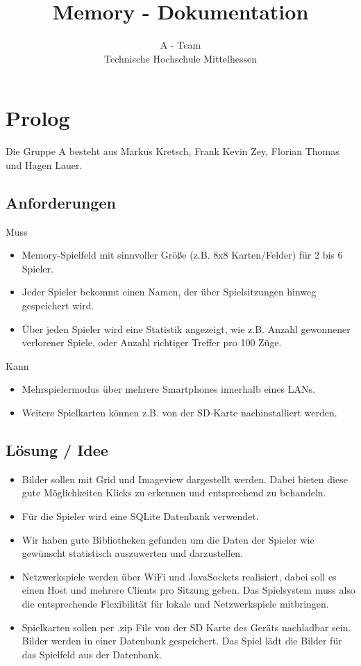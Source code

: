 \documentclass[11pt,a4paper]{article}
\begin{document}
\title{Memory - Dokumentation}
\author{A - Team\\Technische Hochschule Mittelhessen}
\renewcommand{\today}{11. September 2009}
\maketitle

\tableofcontents

\section {Prolog}
Die Gruppe A besteht aus Markus Kretsch, Frank Kevin Zey, Florian Thomas und Hagen Lauer.

\subsection{Anforderungen}

Muss
\begin{itemize}
\item Memory-Spielfeld mit sinnvoller Größe (z.B. 8x8 Karten/Felder) für 2 bis 6 Spieler.
\item Jeder Spieler bekommt einen Namen, der über Spielsitzungen hinweg gespeichert wird.
\item Über jeden Spieler wird eine Statistik angezeigt, wie z.B. Anzahl gewonnener \/ verlorener Spiele, oder Anzahl richtiger Treffer pro 100 Züge.
\end{itemize}
Kann
\begin{itemize}
\item Mehrspielermodus über mehrere Smartphones innerhalb eines LANs.
\item Weitere Spielkarten können z.B. von der SD-Karte nachinstalliert werden.
\end{itemize}
\subsection{Lösung / Idee}

\begin{itemize}

\item Bilder sollen mit Grid und Imageview dargestellt werden. Dabei bieten diese gute Möglichkeiten Klicks zu erkennen und entsprechend zu behandeln.
\item Für die Spieler wird eine SQLite Datenbank verwendet.
\item Wir haben gute Bibliotheken gefunden um die Daten der Spieler wie gewünscht statistisch auszuwerten und darzustellen.
\item Netzwerkspiele werden über WiFi und JavaSockets realisiert, dabei soll es einen Host und mehrere Clients pro Sitzung geben. Das Spielsystem muss also die entsprechende Flexibilität für lokale und Netzwerkspiele mitbringen.
\item Spielkarten sollen per .zip File von der SD Karte des Geräts nachladbar sein. Bilder werden in einer Datenbank gespeichert. Das Spiel lädt die Bilder für das Spielfeld aus der Datenbank.
\end{itemize}
\end{document}
